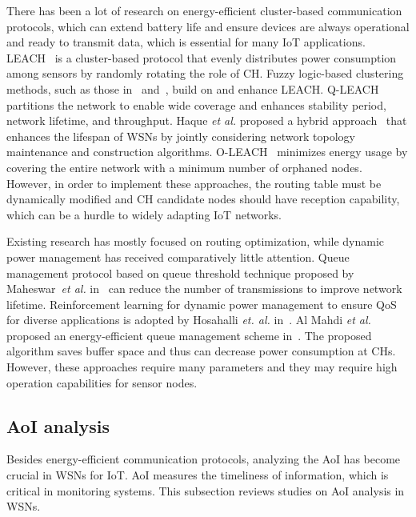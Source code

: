 \documentclass[journal]{IEEEtran}
\begin{document}
There has been a lot of research on energy-efficient cluster-based communication protocols, which can extend battery life and ensure devices are always operational and ready to transmit data, which is essential for many IoT applications. LEACH~\cite{Heinzelman2000} is a cluster-based protocol that evenly distributes power consumption among sensors by randomly rotating the role of CH. Fuzzy logic-based clustering methods, such as those in~\cite{Gupta2005} and~\cite{Dwivedi2021}, build on and enhance LEACH. Q-LEACH~\cite{Manzoor2013} partitions the network to enable wide coverage and enhances stability period, network lifetime, and throughput. Haque \textit{et al.} proposed a hybrid approach~\cite{Haque2022} that enhances the lifespan of WSNs by jointly considering network topology maintenance and construction algorithms. O-LEACH~\cite{Senthil2022} minimizes energy usage by covering the entire network with a minimum number of orphaned nodes. However, in order to implement these approaches, the routing table must be dynamically modified and CH candidate nodes should have reception capability, which can be a hurdle to widely adapting IoT networks.

Existing research has mostly focused on routing optimization, while dynamic power management has received comparatively little attention. Queue management protocol based on queue threshold technique proposed by Maheswar~\textit{et al.} in~\cite{Maheswar2018} can reduce the number of transmissions to improve network lifetime. Reinforcement learning for dynamic power management to ensure QoS for diverse applications is adopted by Hosahalli \textit{et. al.} in~\cite{Hosahalli2020}. Al Mahdi \textit{et al.} proposed an energy-efficient queue management scheme in~\cite{Alwasef2021energy}. The proposed algorithm saves buffer space and thus can decrease power consumption at CHs. However, these approaches require many parameters and they may require high operation capabilities for sensor nodes.


\subsection{AoI analysis}
\label{subsec:aoi}
Besides energy-efficient communication protocols, analyzing the AoI has become crucial in WSNs for IoT. AoI measures the timeliness of information, which is critical in monitoring systems. This subsection reviews studies on AoI analysis in WSNs.
\end{document}
